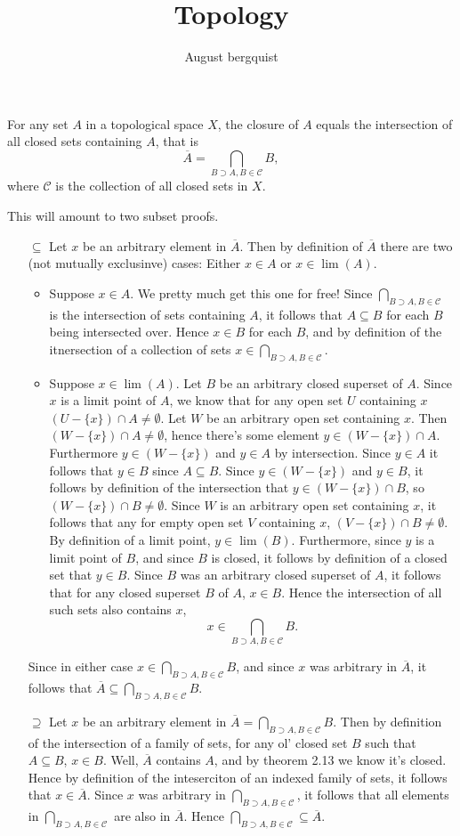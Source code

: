 \documentclass{article}
\title{Topology}
\author{August bergquist}
\theoremstyle{definition}
\newcommand{\cc}{\mathcal{C}}
\begin{document}
 For any set $A$ in a topological space $X$, the closure of $A$ equals the intersection of all closed sets containing $A$, that is 
$$\overline{A} = \bigcap_{B\supset A, B\in \cc}B,$$
where $\cc$ is the collection of all closed sets in $X$.

 This will amount to two subset proofs. 
\begin{itemize}
    \item[$\subseteq$] Let $x$ be an arbitrary element in $\overline{A}$. Then by definition of $\overline{A}$ there are two (not mutually exclusinve) cases: Either $x\in A$ or $x\in \lim(A)$.
    \begin{itemize}
        \item Suppose $x\in A$. We pretty much get this one for free! Since $ \bigcap_{B\supset A, B\in \cc}$ is the intersection of sets containing $A$, it follows that $A\subseteq B$ for each $B$ being intersected over. Hence $x\in B$ for each $B$, and by definition of the itnersection of a collection of sets $x \in \bigcap_{B\supset A, B\in \cc}$.
        \item Suppose $x\in \lim(A)$. Let $B$ be an arbitrary closed superset of $A$. Since $x$ is a limit point of $A$, we know that for any open set $U$ containing $x$ $(U-\{x\})\cap A \ne \emptyset$. Let $W$ be an arbitrary open set containing $x$. Then $(W- \{x\})\cap A \ne \emptyset$, hence there's some element $y\in (W- \{x\})\cap A$. Furthermore $y\in (W-\{x\})$ and $y\in A$ by intersection. Since $y\in A$ it follows that $y\in B$ since $A\subseteq B$. Since $y\in (W-\{x\})$ and $y\in B$, it follows by definition of the intersection that $y\in (W-\{x\})\cap B$, so $(W-\{x\})\cap B \ne \emptyset$. Since $W$ is an arbitrary open set containing $x$, it follows that any for empty open set $V$ containing $x $, $(V-\{x\}) \cap B \ne \emptyset$. By definition of a limit point, $y\in \lim (B)$. Furthermore, since $y$ is a limit point of $B$, and since $B$ is closed, it follows by definition of a closed set that $y\in B$. Since $B$ was an arbitrary closed superset of $A$, it follows that for any closed superset $B$ of $A$, $x\in B$. Hence the intersection of all such sets also contains $x$,
        $$x\in \bigcap_{B\supset A, B\in \cc}B.$$
    \end{itemize}
    Since in either case $x\in \bigcap_{B\supset A, B\in \cc}B$, and since $x$ was arbitrary in $\overline{A}$, it follows that $\overline{A} \subseteq\bigcap_{B\supset A, B\in \cc}B.$
    \item[$\supseteq$] Let $x$ be an arbitrary element in $ \overline{A} = \bigcap_{B\supset A, B\in \cc}B$. Then by definition of the intersection of a family of sets, for any ol' closed set $B$ such that $A\subseteq B$, $x\in B$. Well, $\overline{A}$ contains $A$, and by theorem 2.13 we know it's closed. Hence by definition of the inteserciton of an indexed family of sets, it follows that $x\in \overline{A}$. Since $x$ was arbitrary in $\bigcap_{B\supset A, B\in \cc}$, it follows that all elements in $\bigcap_{B\supset A, B\in \cc} $ are also in $\overline{A}$. Hence $\bigcap_{B\supset A, B\in \cc} \subseteq \overline{A}. $
\end{itemize}
\end{document}
